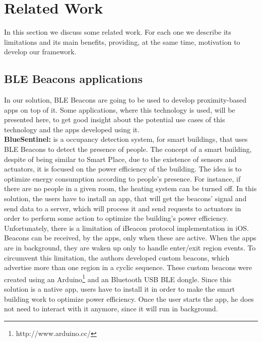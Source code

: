 
%
%

\section{Related Work}
\label{sec:related_work}
In this section we discuss some related work.
For each one we describe its limitations and its main
benefits, providing, at the same time, motivation
to develop our framework.

\subsection{BLE Beacons applications}
\label{sub:ble_beacons_applications}
In our solution, BLE Beacons are going to
be used to develop proximity-based apps
on top of it. Some
applications, where this technology is used,
will be presented here, to
get good insight about the potential use cases of this 
technology and the apps developed using it.
\\
\textbf{BlueSentinel:}\cite{Conte2014} is a 
occupancy detection system, for smart buildings,
that uses BLE Beacons to detect the presence of
people. The concept of a smart building,
despite of being similar to Smart Place,
due to the existence of sensors and actuators,
it is focused on the power efficiency of the
building. The idea is to optimize energy
consumption according to people's presence.
For instance, if there are no people in a given room,
the heating system can be turned off.
In this solution, the users have to install
an app, that will get the beacons' signal and
send data to a server, which will process it
and send requests to actuators in order to
perform some action to optimize the
building's power efficiency.
Unfortunately, there is a limitation
of iBeacon protocol implementation
in iOS. Beacons can be received, by the apps,
only when these are active. When the apps are in
background, they are waken up only to handle
enter/exit region events. To circumvent this
limitation, the authors developed custom
beacons, which advertise more than one region
in a cyclic sequence. These custom beacons
were created using an 
Arduino\footnote{http://www.arduino.cc/}
and an Bluetooth USB BLE dongle.
Since this solution is a native app,
users have to install it in order
to make the smart building work to
optimize power efficiency.
Once the user starts the app, he does not
need to interact with it anymore, since it
will run in background.
